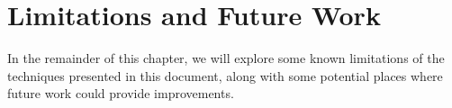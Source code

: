 \section{Limitations and Future Work}

In the remainder of this chapter, we will explore some known
limitations of the techniques presented in this document, along with
some potential places where future work could provide improvements. 



